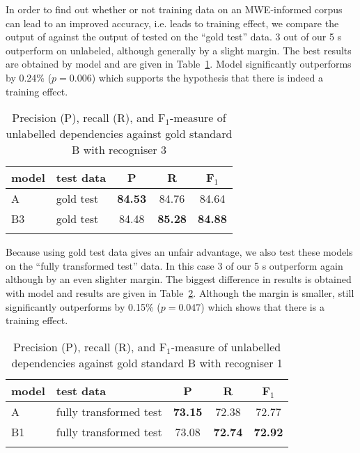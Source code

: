 \documentclass[output=paper]{langsci/langscibook}
\begin{document}
\indent In order to find out whether or not training data on an MWE-informed corpus can lead to an improved accuracy, i.e. leads to training effect, we compare the output of {\modelB} against the output of {\modelA} tested on the ``gold test'' data. 3 out of our 5 {\modelB}s outperform {\modelA} on unlabeled, although generally by a slight margin. The best results are obtained by model and are given in Table~\ref{del:tab:res1}. Model significantly outperforms {\modelA} by 0.24\% ($p=0.006$) which supports the hypothesis that there is indeed a training effect.

\begin{table}[h]
    \centering
    \begin{tabular}{l l c c c} %
      \lsptoprule
        \textnormal{model}
        & \textnormal{test data}
        & \textnormal{P}
        & \textnormal{R}
        & \textnormal{F$_1$}
        \\ %
        \midrule
        A & gold test &\textbf{84.53}  &84.76 &84.64 \\
        B3 & gold test &84.48  &\textbf{85.28}  &\textbf{84.88} \tabularnewline %
        \lspbottomrule
    \end{tabular}
    \caption{Precision (P), recall (R), and F$_1$-measure of unlabelled dependencies against gold standard B with recogniser 3 \label{del:tab:res1}}
\end{table}

\indent Because using gold test data gives {\modelB} an unfair advantage, we also test these models on the ``fully transformed test'' data. In this case 3 of our 5 {\modelB}s outperform {\modelA} again although by an even slighter margin. The biggest difference in results is obtained with model and results are given in Table~\ref{del:tab:res1bis}. Although the margin is smaller, {\modelB} still significantly outperforms {\modelA} by 0.15\% ($p=0.047$) which shows that there is a training effect.

\begin{table}[h]
    \centering
    \begin{tabular}{l l c c c} %
      \lsptoprule
        \textnormal{model}
        & \textnormal{test data}
        & \textnormal{P}
        & \textnormal{R}
        & \textnormal{F$_1$}
        \\ %
        \midrule
        A & fully transformed test &\textbf{73.15}  &72.38  & 72.77 \\
        B1 & fully transformed test &73.08  &\textbf{72.74}  & \textbf{72.92} \tabularnewline %
        \lspbottomrule
    \end{tabular}
    \caption{Precision (P), recall (R), and F$_1$-measure of unlabelled dependencies against gold standard B with recogniser 1 \label{del:tab:res1bis}}
\end{table}
\end{document}
